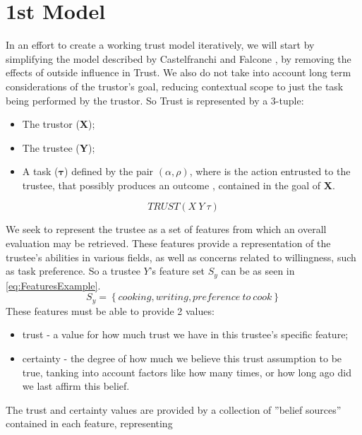 \section{1st Model}
\label{sec:Model}

In an effort to create a working trust model iteratively, we will start by simplifying the model described by Castelfranchi and Falcone \cite{Castelfranchi1998}, by removing the effects of outside influence in Trust. We also do not take into account long term considerations of the trustor's goal, reducing contextual scope to just the task being performed by the trustor. So Trust is represented by a 3-tuple:

\begin{itemize}
	\item The trustor (\textbf{X});
	\item The trustee (\textbf{Y});
	\item A task ($\bm{\tau}$) defined by the pair $(\alpha, \rho)$, where \bm{$\alpha$} is the action entrusted to the trustee, that possibly produces an outcome \bm{$\rho$}, contained in the goal of \textbf{X}.
\end{itemize}
\begin{equation}
TRUST(X\ Y\ \tau)
\label{eq:TrustRelation}
\end{equation}

We seek to represent the trustee as a set of features from which an overall evaluation may be retrieved. These features provide a representation of the trustee's abilities in various fields, as well as concerns related to willingness, such as task preference. So a trustee $Y$'s feature set $ S_y $ can be as seen in \ref{eq:FeaturesExample}.
\begin{equation}
S_y=\left\{cooking, writing, preference\ to\ cook\right\}
\label{eq:FeaturesExample}
\end{equation}
These features must be able to provide 2 values:

\begin{itemize}
	\item trust - a value for how much trust we have in this trustee's specific feature;
	\item certainty - the degree of how much we believe this trust assumption to be true, tanking into account factors like how many times, or how long ago did we last affirm this belief.
\end{itemize}

The trust and certainty values are provided by a collection of ''belief sources'' contained in each feature, representing 

